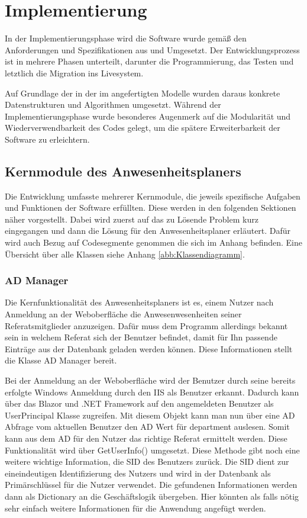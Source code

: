 \section{Implementierung}
\label{sec:Implementierung}
In der Implementierungsphase wird die Software wurde gemäß den Anforderungen und Spezifikationen aus  und  Umgesetzt. Der Entwicklungsprozess ist in mehrere Phasen unterteilt, darunter die Programmierung, das Testen und letztlich die Migration ins Livesystem.

Auf Grundlage der in der im  angefertigten Modelle wurden daraus konkrete Datenstrukturen und Algorithmen umgesetzt. Während der Implementierungsphase wurde besonderes Augenmerk auf die Modularität und Wiederverwendbarkeit des Codes gelegt, um die spätere Erweiterbarkeit der Software zu erleichtern.

\subsection{Kernmodule des Anwesenheitsplaners}
\label{sec:Kernmodule}
Die Entwicklung umfasste mehrerer Kernmodule, die jeweils spezifische Aufgaben und Funktionen der Software erfüllten. Diese werden in den folgenden Sektionen näher vorgestellt. Dabei wird zuerst auf das zu Lösende Problem kurz eingegangen und dann die Lösung für den Anwesenheitsplaner erläutert. Dafür wird \ggfs auch Bezug auf Codesegmente genommen die sich im Anhang befinden. Eine Übersicht über alle Klassen siehe Anhang \ref{abb:Klassendiagramm}.

\subsubsection{AD Manager}
\label{sec:ADManager}
Die Kernfunktionalität des Anwesenheitsplaners ist es, einem Nutzer nach Anmeldung an der Weboberfläche die Anwesenwesenheiten seiner Referatsmitglieder anzuzeigen. Dafür muss dem Programm allerdings bekannt sein in welchem Referat sich der Benutzer befindet, damit für Ihn passende Einträge aus der Datenbank geladen werden können. Diese Informationen stellt die Klasse AD Manager bereit.

Bei der Anmeldung an der Weboberfläche wird der Benutzer durch seine bereits erfolgte Windows Anmeldung durch den IIS als Benutzer erkannt. Dadurch kann über das Blazor und .NET Framework auf den angemeldeten Benutzer als UserPrincipal Klasse zugreifen. Mit diesem Objekt kann man nun über eine AD Abfrage vom aktuellen Benutzer den AD Wert für department auslesen. Somit kann aus dem AD für den Nutzer das richtige Referat ermittelt werden. Diese Funktionalität wird über GetUserInfo() umgesetzt. Diese Methode gibt noch eine weitere wichtige Information, die SID des Benutzers zurück. Die SID dient zur eineindeutigen Identifizierung des Nutzers und wird in der Datenbank als Primärschlüssel für die Nutzer verwendet. Die gefundenen Informationen werden dann als Dictionary an die Geschäftslogik übergeben. Hier könnten als falls nötig sehr einfach weitere Informationen für die Anwendung angefügt werden.

